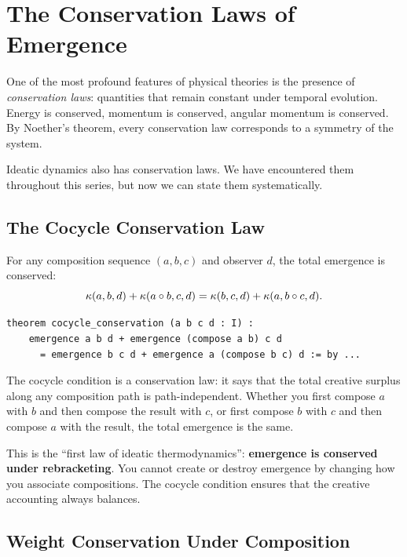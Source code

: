 \section{The Conservation Laws of Emergence}

One of the most profound features of physical theories is the presence of
\emph{conservation laws}: quantities that remain constant under temporal
evolution. Energy is conserved, momentum is conserved, angular momentum is
conserved. By Noether's theorem, every conservation law corresponds to a
symmetry of the system.

Ideatic dynamics also has conservation laws. We have encountered them
throughout this series, but now we can state them systematically.

\subsection{The Cocycle Conservation Law}

\begin{theorem}
\label{thm:cocycle-conservation}
For any composition sequence $(a, b, c)$ and observer $d$, the total emergence
is conserved:
\[
  \kappa(a, b, d) + \kappa(a \circ b, c, d)
  = \kappa(b, c, d) + \kappa(a, b \circ c, d).
\]
\end{theorem}

\begin{lstlisting}[caption={Conservation laws (IDT\_v3\_Emergence.lean)}]
theorem cocycle_conservation (a b c d : I) :
    emergence a b d + emergence (compose a b) c d
      = emergence b c d + emergence a (compose b c) d := by ...
\end{lstlisting}

\begin{interpretation}
The cocycle condition is a conservation law: it says that the total creative
surplus along any composition path is path-independent. Whether you first
compose $a$ with $b$ and then compose the result with $c$, or first compose
$b$ with $c$ and then compose $a$ with the result, the total emergence is
the same.

This is the ``first law of ideatic thermodynamics'': \textbf{emergence is
conserved under rebracketing}. You cannot create or destroy emergence by
changing how you associate compositions. The cocycle condition ensures that
the creative accounting always balances.
\end{interpretation}

\subsection{Weight Conservation Under Composition}


